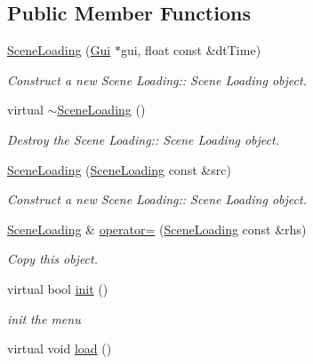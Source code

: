 \subsection*{Public Member Functions}
\begin{DoxyCompactItemize}
\item 
\hyperlink{class_scene_loading_a26b7ef7d352763ba43bc5182652b6df4}{Scene\+Loading} (\hyperlink{class_gui}{Gui} $\ast$gui, float const \&dt\+Time)
\begin{DoxyCompactList}\small\item\em Construct a new Scene Loading\+:\+: Scene Loading object. \end{DoxyCompactList}\item 
\mbox{\label{class_scene_loading_a8b153a87878ddb521cc2940204e7414e}} 
virtual \hyperlink{class_scene_loading_a8b153a87878ddb521cc2940204e7414e}{$\sim$\+Scene\+Loading} ()
\begin{DoxyCompactList}\small\item\em Destroy the Scene Loading\+:\+: Scene Loading object. \end{DoxyCompactList}\item 
\hyperlink{class_scene_loading_a7ea2382387ab3fd9a9d9b9a605f28915}{Scene\+Loading} (\hyperlink{class_scene_loading}{Scene\+Loading} const \&src)
\begin{DoxyCompactList}\small\item\em Construct a new Scene Loading\+:\+: Scene Loading object. \end{DoxyCompactList}\item 
\hyperlink{class_scene_loading}{Scene\+Loading} \& \hyperlink{class_scene_loading_a9b3dbaab5a584f4a90e25a381ddd800f}{operator=} (\hyperlink{class_scene_loading}{Scene\+Loading} const \&rhs)
\begin{DoxyCompactList}\small\item\em Copy this object. \end{DoxyCompactList}\item 
virtual bool \hyperlink{class_scene_loading_aa0463a9826f1b50e5980e41d57c80778}{init} ()
\begin{DoxyCompactList}\small\item\em init the menu \end{DoxyCompactList}\item 
\mbox{\label{class_scene_loading_a3621ebafd91adcb3f597e446a3ce9dc9}} 
virtual void \hyperlink{class_scene_loading_a3621ebafd91adcb3f597e446a3ce9dc9}{load} ()

\end{DoxyCompactItemize}
